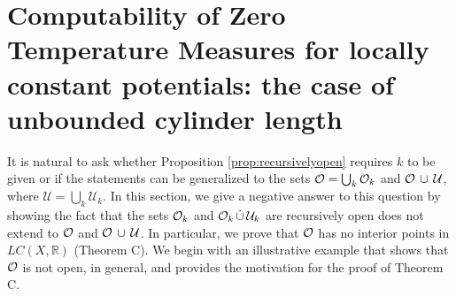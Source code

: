 \documentclass[11pt, reqno]{amsart}
\newcommand{\bR}{{\mathbb R}}
\newcommand{\cU}{{\mathcal U}}
\begin{document}
\section{Computability of Zero Temperature Measures for locally constant potentials: the case of unbounded cylinder length}\label{sec:5}

It is natural to ask whether Proposition \ref{prop:recursivelyopen} requires $k$ to be given or if the statements can be generalized to the sets $\mathcal O=\bigcup_k \mathcal O_k$ and $\cO\,\cup\,\cU$, where $\cU=\bigcup_k \cU_k$.  In this section, we give a negative answer to this question by showing the fact that the sets $\mathcal O_k$ and $\cO_k\,\dot\cup\,\cU_k$ are recursively open does not extend to $\mathcal O$ and $\cO\,\cup\,\cU$.  In particular, we prove  that $\mathcal O$ has no interior points in $LC(X,\bR)$ (Theorem C).
We begin with an illustrative example that shows that $\mathcal O$ is not open, in general, and provides the motivation for the proof of Theorem C.
\end{document}
